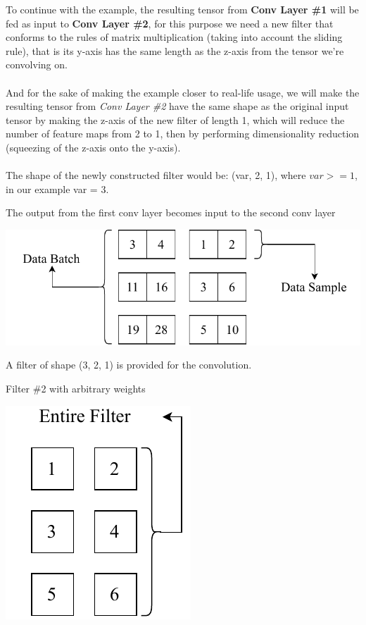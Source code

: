 \documentclass[a4paper, 12pt]{report}
\newcommand\tab[1][1cm]{\hspace*{#1}}
\begin{document}
To continue with the example, the resulting tensor from \textbf{Conv Layer \#1} will be fed as input to \textbf{Conv Layer \#2}, for this purpose we need a new filter that conforms to the rules of matrix multiplication (taking into account the sliding rule), that is its y-axis has the same length as the z-axis from the tensor we're convolving on.\\\\
And for the sake of making the example closer to real-life usage, we will make the resulting tensor from \textit{Conv Layer \#2} have the same shape as the original input tensor by making the z-axis of the new filter of length 1, which will reduce the number of feature maps from 2 to 1, then by performing dimensionality reduction (squeezing of the z-axis onto the y-axis).\\\\
The shape of the newly constructed filter would be: (var, 2, 1), where $ var >= 1 $, in our example var = 3.
\begin{blockfigure}{The output from the first conv layer becomes input to the second conv layer}
	\begin{center}
		\includegraphics[width=\textwidth]{secondinput_final}
	\end{center}
\end{blockfigure}
\begin{tcbraster}[raster columns=2,raster rows=1,
	enhanced,size=small,fit algorithm=hybrid* ]
	\begin{tcolorbox}[frame hidden,colback=white]
		\tab A filter of shape (3, 2, 1) is provided \tab for the convolution.
	\end{tcolorbox}
	\begin{inlinefigure}{Filter \#2 with arbitrary weights}
		\begin{center}
			\includegraphics[height=0.3\textheight]{filter2}
		\end{center}
	\end{inlinefigure}
\end{tcbraster}
\end{document}
